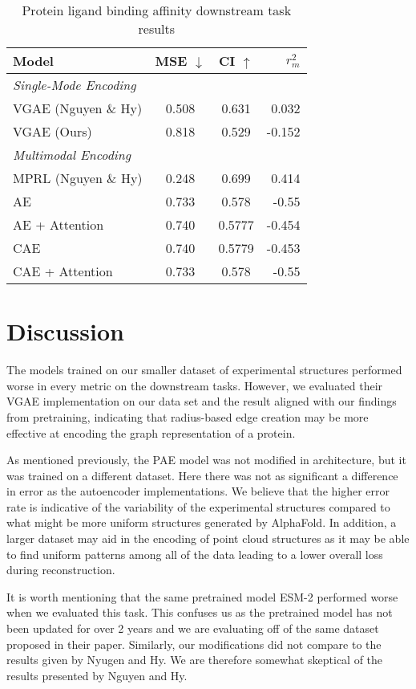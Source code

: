 \documentclass{article}
\begin{document}
\begin{table}[h]
    \centering
    \begin{tabular}{|l c c r|} 
 \hline
 \bf{Model} & \bf{MSE $\downarrow$} & \textbf{CI $\uparrow$} & $r_m^2$ \\
 \hline\hline
 \textit{Single-Mode Encoding} & \\
 \hline
VGAE (Nguyen \& Hy) & 0.508 & 0.631 & 0.032 \\ 
VGAE (Ours) & 0.818 & 0.529 & -0.152 \\ 
\hline\hline
\textit{Multimodal Encoding} & \\
\hline
MPRL (Nguyen \& Hy) & 0.248 & 0.699 & 0.414 \\
AE & 0.733 & 0.578 & -0.55 \\
AE + Attention & 0.740 & 0.5777 & -0.454 \\
CAE & 0.740 & 0.5779 & -0.453 \\
CAE + Attention & 0.733 & 0.578 & -0.55 \\
\hline
\end{tabular}
    \caption{Protein ligand binding affinity downstream task results }
    \label{tab:PLA_results}
\end{table}

\section{Discussion}
The models trained on our smaller dataset of experimental structures performed worse in every metric on the downstream tasks. However, we evaluated their VGAE implementation on our data set and the result aligned with our findings from pretraining, indicating that radius-based edge creation may be more effective at encoding the graph representation of a protein. 

As mentioned previously, the PAE model was not modified in architecture, but it was trained on a different dataset. Here there was not as significant a difference in error as the autoencoder implementations. We believe that the higher error rate is indicative of the variability of the experimental structures compared to what might be more uniform structures generated by AlphaFold. In addition, a larger dataset may aid in the encoding of point cloud structures as it may be able to find uniform patterns among all of the data leading to a lower overall loss during reconstruction.
 
It is worth mentioning that the same pretrained model ESM-2 performed worse when we evaluated this task. This confuses us as the pretrained model has not been updated for over 2 years and we are evaluating off of the same dataset proposed in their paper. Similarly, our modifications did not compare to the results given by Nyugen and Hy. We are therefore somewhat skeptical of the results presented by Nguyen and Hy.
\end{document}
